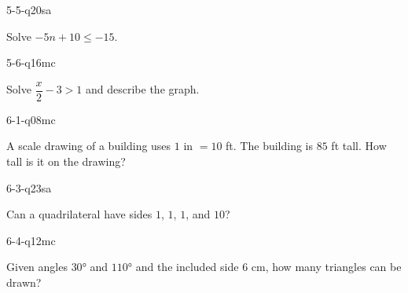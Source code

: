 \begin{practiceQuestion}{5-5-q20}{sa}
\begin{questionText}
Solve $-5n + 10 \leq -15$.
\end{questionText}
\end{practiceQuestion}

\begin{practiceQuestion}{5-6-q16}{mc}
\begin{questionText}
Solve $\dfrac{x}{2} - 3 > 1$ and describe the graph.
\end{questionText}
\end{practiceQuestion}

\begin{practiceQuestion}{6-1-q08}{mc}
\begin{questionText}
A scale drawing of a building uses $1$ in $= 10$ ft. The building is $85$ ft tall. How tall is it on the drawing?
\end{questionText}
\end{practiceQuestion}

\begin{practiceQuestion}{6-3-q23}{sa}
\begin{questionText}
Can a quadrilateral have sides $1$, $1$, $1$, and $10$?
\end{questionText}
\end{practiceQuestion}

\begin{practiceQuestion}{6-4-q12}{mc}
\begin{questionText}
Given angles $30°$ and $110°$ and the included side $6$ cm, how many triangles can be drawn?
\end{questionText}
\end{practiceQuestion}

